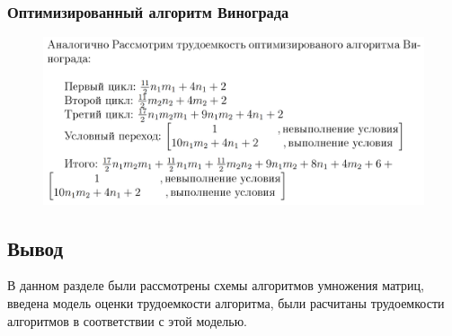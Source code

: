 \documentclass[a4paper, 12pt]{article}
\begin{document}
\begin{flushleft}
	\subsubsection{Оптимизированный алгоритм Винограда}
	\begin{figure}[h]
		\centering \includegraphics[scale=0.65]{224}
	\end{figure}
	\subsection{Вывод}
	\hspace*{5mm} В данном разделе были рассмотрены схемы алгоритмов умножения матриц, введена модель оценки трудоемкости алгоритма, были расчитаны трудоемкости алгоритмов в соответствии с этой моделью.
\end{flushleft}

\newpage
\end{document}
